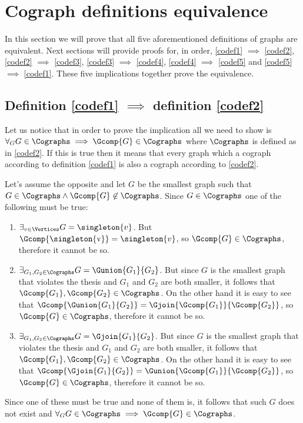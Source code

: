 
\section{Cograph definitions equivalence}\label{r:codefeq}

In this section we will prove that all five aforementioned definitions of graphs are equivalent. Next sections will provide proofs for, in order, \ref{codef1} $\implies$ \ref{codef2}, \ref{codef2} $\implies$ \ref{codef3}, \ref{codef3} $\implies$ \ref{codef4}, \ref{codef4} $\implies$ \ref{codef5} and \ref{codef5} $\implies$ \ref{codef1}. These five implications together prove the equivalence.

\subsection{Definition \ref{codef1} $\implies$ definition \ref{codef2}}

Let us notice that in order to prove the implication all we need to show is $\forall_G G \in \Cographs \implies \Gcomp{G} \in \Cographs$ where $\Cographs$ is defined as in \ref{codef2}. If this is true then it means that every graph which a cograph according to definition \ref{codef1} is also a cograph according to \ref{codef2}.

Let's assume the opposite and let $G$ be the smallest graph such that $G \in \Cographs \land \Gcomp{G} \not\in \Cographs$. Since $G \in \Cographs$ one of the following must be true:
\begin{enumerate}
    \item $\exists_{v\in \Vertices} G = \singleton{v}$. But $\Gcomp{\mbox{\singleton{v}}\raisebox{3mm}{}} = \singleton{v}$, so $\Gcomp{G} \in \Cographs$, therefore it cannot be so.
    \item $\exists_{G_1, G_2 \in \Cographs} G = \Gunion{G_1}{G_2}$. But since $G$ is the smallest graph that violates the thesis and $G_1$ and $G_2$ are both smaller, it follows that $\Gcomp{G_1}, \Gcomp{G_2} \in \Cographs$. On the other hand it is easy to see that $\Gcomp{\Gunion{G_1}{G_2}} = \Gjoin{\Gcomp{G_1}}{\Gcomp{G_2}}$, so $\Gcomp{G} \in \Cographs$, therefore it cannot be so.
    \item $\exists_{G_1, G_2 \in \Cographs} G = \Gjoin{G_1}{G_2}$. But since $G$ is the smallest graph that violates the thesis and $G_1$ and $G_2$ are both smaller, it follows that $\Gcomp{G_1}, \Gcomp{G_2} \in \Cographs$. On the other hand it is easy to see that $\Gcomp{\Gjoin{G_1}{G_2}} = \Gunion{\Gcomp{G_1}}{\Gcomp{G_2}}$, so $\Gcomp{G} \in \Cographs$, therefore it cannot be so.
\end{enumerate}
Since one of these must be true and none of them is, it follows that such $G$ does not exist and $\forall_G G \in \Cographs \implies \Gcomp{G} \in \Cographs$.


